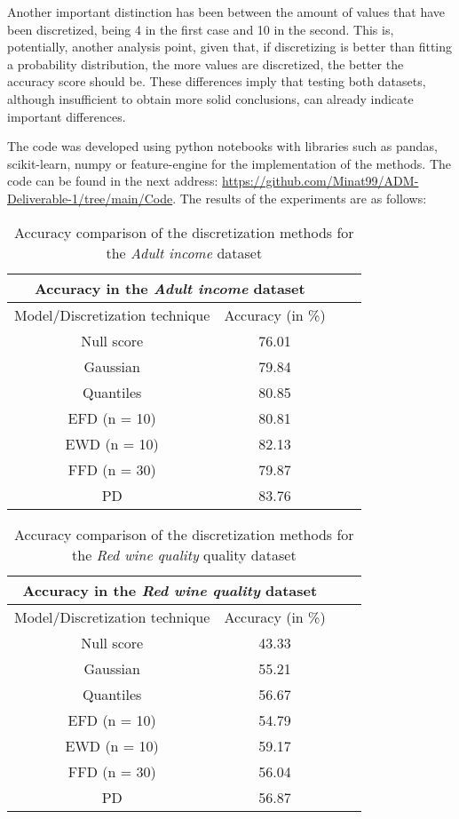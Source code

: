 \documentclass{article}
\begin{document}
Another important distinction has been between the amount of values that have been discretized, being 4 in the first case and 10 in the second. This is, potentially, another analysis point, given that, if discretizing is better than fitting a probability distribution, the more values are discretized, the better the accuracy score should be. These differences imply that testing both datasets, although insufficient to obtain more solid conclusions, can already indicate important differences. 

The code was developed using python notebooks with libraries such as pandas, scikit-learn, numpy or feature-engine for the implementation of the methods. The code can be found in the next address: \url{https://github.com/Minat99/ADM-Deliverable-1/tree/main/Code}. The results of the experiments are as follows:
\begin{table}[h!]
\centering
    \begin{tabular}{|c||c|c|c|}
         \hline
         \multicolumn{2}{|c|}{Accuracy in the \emph{Adult income} dataset} \\
         \hline
         Model/Discretization technique & Accuracy (in \%)\\
         \hline
         Null score & 76.01\\
         \hline
         Gaussian & 79.84\\
         \hline
         Quantiles & 80.85\\
         \hline
         EFD (n = 10) & 80.81\\
         \hline
         EWD (n = 10) & 82.13\\
         \hline
         FFD (n = 30) & 79.87\\
         \hline
         PD & 83.76\\
         \hline
    \end{tabular}
\caption{Accuracy comparison of the discretization methods for the \emph{Adult income} dataset}
\label{table:1}
\end{table}

\begin{table}[h!]
\centering
    \begin{tabular}{|c||c|c|c|}
         \hline
         \multicolumn{2}{|c|}{Accuracy in the \emph{Red wine quality} dataset} \\
         \hline
         Model/Discretization technique & Accuracy (in \%)\\
         \hline
         Null score & 43.33\\
         \hline
         Gaussian & 55.21\\
         \hline
         Quantiles & 56.67\\
         \hline
         EFD (n = 10) & 54.79\\
         \hline
         EWD (n = 10) & 59.17\\
         \hline
         FFD (n = 30) & 56.04\\
         \hline
         PD & 56.87\\
         \hline
    \end{tabular}
\caption{Accuracy comparison of the discretization methods for the \emph{Red wine quality} quality dataset}
\label{table:1}
\end{table}
\end{document}
